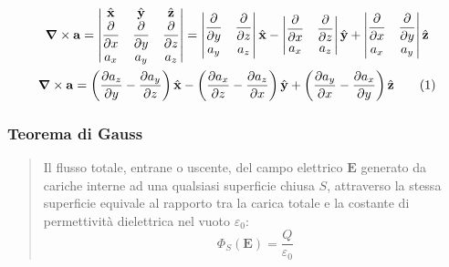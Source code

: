 \documentclass{article}
\newcommand{\vect}[1]{\boldsymbol{\mathbf{#1}}}
\newcommand{\tageq}{\tag{\stepcounter{equation}\theequation}}
\numberwithin{equation}{subsection}
\begin{document}
\begin{gather*}
    {\vect\nabla}\times\vect{a}=
    \begin{vmatrix}
        \hat{\vect{x}} & \hat{\vect{y}} & \hat{\vect{z}} \\
        \displaystyle\frac{\partial}{\partial x} & \displaystyle\frac{\partial}{\partial y} & \displaystyle\frac{\partial}{\partial z}\\
        a_x & a_y & a_z
    \end{vmatrix}=
    \begin{vmatrix}
        \displaystyle\frac{\partial}{\partial y} & \displaystyle\frac{\partial }{\partial z}\\
        a_y & a_z
    \end{vmatrix}\hat{\vect{x}}-
    \begin{vmatrix}
        \displaystyle\frac{\partial}{\partial x} & \displaystyle\frac{\partial}{\partial z}\\
        a_x & a_z
    \end{vmatrix}\hat{\vect{y}}+
    \begin{vmatrix}
        \displaystyle\frac{\partial}{\partial x} & \displaystyle\frac{\partial}{\partial y}\\
        a_x & a_y
    \end{vmatrix}\hat{\vect{z}}\\
    {\vect\nabla}\times\vect{a}=\left(\displaystyle\frac{\partial a_z}{\partial y}-\frac{\partial a_y}{\partial z}\right)\hat{\vect{x}}-\left(\frac{\partial a_x}{\partial z}-\frac{\partial a_z}{\partial x}\right)\hat{\vect{y}}+\left(\frac{\partial a_y}{\partial x}-\frac{\partial a_x}{\partial y}\right)\hat{\vect{z}}\tageq
\end{gather*}

\subsubsection{Teorema di Gauss}

\begin{quotation}
    Il flusso totale, entrane o uscente, del campo elettrico $\vect{E}$ generato da cariche interne ad una qualsiasi superficie chiusa $S$, attraverso 
    la stessa superficie equivale al rapporto tra la carica totale e la costante di permettività dielettrica nel vuoto $\varepsilon_0$:
    \begin{equation}
        \Phi_{S}(\vect{E})=\displaystyle\frac{Q}{\varepsilon_0}
    \end{equation}
\end{quotation}
\end{document}
